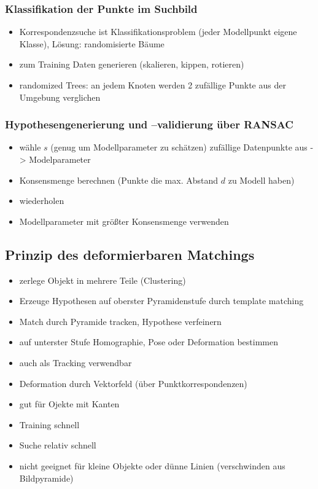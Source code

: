 \documentclass[11pt]{article}
\begin{document}
\subsubsection{Klassifikation der Punkte im Suchbild}
\begin{itemize}
    \item Korrespondenzsuche ist Klassifikationsproblem (jeder Modellpunkt eigene Klasse), Lösung: randomisierte Bäume
    \item zum Training Daten generieren (skalieren, kippen, rotieren)
    \item randomized Trees: an jedem Knoten werden 2 zufällige Punkte aus der Umgebung verglichen
\end{itemize}

\subsubsection{Hypothesengenerierung und –validierung über RANSAC}
\begin{itemize}
    \item wähle $s$ (genug um Modellparameter zu schätzen) zufällige Datenpunkte aus -> Modelparameter
    \item Konsensmenge berechnen (Punkte die max. Abstand $d$ zu Modell haben)
    \item wiederholen
    \item Modellparameter mit größter Konsensmenge verwenden
\end{itemize}

\subsection{Prinzip des deformierbaren Matchings}
\begin{itemize}
    \item zerlege Objekt in mehrere Teile (Clustering)
    \item Erzeuge Hypothesen auf oberster Pyramidenstufe durch template matching
    \item Match durch Pyramide tracken, Hypothese verfeinern
    \item auf unterster Stufe Homographie, Pose oder Deformation bestimmen
    \item auch als Tracking verwendbar
    \item Deformation durch Vektorfeld (über Punktkorrespondenzen)
    \item gut für Ojekte mit Kanten
    \item Training schnell
    \item Suche relativ schnell
    \item nicht geeignet für kleine Objekte oder dünne Linien (verschwinden aus Bildpyramide)
\end{itemize}
\end{document}
